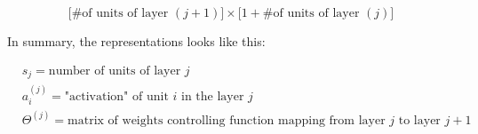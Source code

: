 $$\Big[\text{\# of units of layer } (j + 1)\Big] \times \Big[1 + \text{\# of units of layer } (j)\Big]$$

\newpage

\noindent In summary, the representations looks like this:

\begin{align*}
	& s_j = \text{number of units of layer } j \\
	& a^{(j)}_i = \text{"activation" of unit } i \text{ in the layer } j \\
	& \Theta^{(j)} = \text{matrix of weights controlling function mapping from layer } j \text{ to layer } j + 1 \\ 
\end{align*}